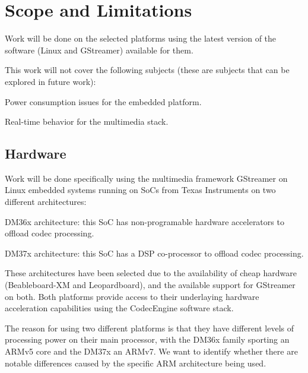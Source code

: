 \section{Scope and Limitations}
Work will be done on the selected platforms using the latest version of the software (Linux and GStreamer) available for them.

This work will not cover the following subjects (these are subjects that can be explored in future work):
\begin{itemize*}
\item Power consumption issues for the embedded platform.
\item Real-time behavior for the multimedia stack.
\end{itemize*}

\subsection{Hardware}
Work will be done specifically using the multimedia framework GStreamer on Linux embedded systems running on \acp{SoC} from Texas Instruments on two different architectures:
\begin{itemize*}
\item DM36x architecture: this \ac{SoC} has non-programable hardware accelerators to offload codec processing.
\item DM37x architecture: this \ac{SoC} has a \ac{DSP} co-processor to offload codec processing.
\end{itemize*}

These architectures have been selected due to the availability of cheap hardware (Beableboard-XM and Leopardboard), and the available support for GStreamer on both. Both platforms provide access to their underlaying hardware acceleration capabilities using the CodecEngine software stack\cite{Preissig:2006fk}.

The reason for using two different platforms is that they have different levels of processing power on their main processor, with the DM36x family sporting an ARMv5 core and the DM37x an ARMv7. We want to identify whether there are notable differences caused by the specific ARM architecture being used.
